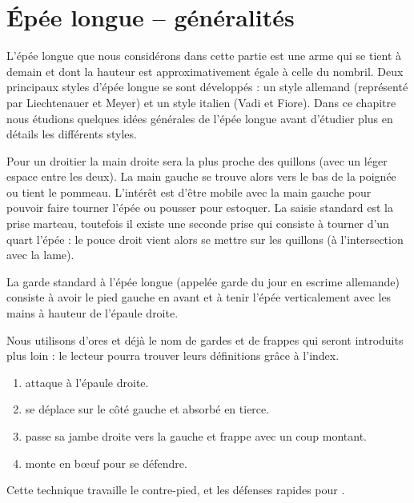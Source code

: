 \chapter{Épée longue -- généralités}


L'épée longue que nous considérons dans cette partie est une arme qui se tient à demain et dont la hauteur est approximativement égale à celle du nombril.
Deux principaux styles d'épée longue se sont développés : un style allemand (représenté par Liechtenauer et Meyer) et un style italien (Vadi et Fiore).
Dans ce chapitre nous étudions quelques idées générales de l'épée longue avant d'étudier plus en détails les différents styles.

Pour un droitier la main droite sera la plus proche des quillons (avec un léger espace entre les deux).
La main gauche se trouve alors vers le bas de la poignée ou tient le pommeau.
L'intérêt est d'être mobile avec la main gauche pour pouvoir faire tourner l'épée ou pousser pour estoquer.
La saisie standard est la prise marteau, toutefois il existe une seconde prise qui consiste à tourner d'un quart l'épée : le pouce droit vient alors se mettre sur les quillons (à l'intersection avec la lame).

La garde standard à l'épée longue (appelée garde du jour en escrime allemande) consiste à avoir le pied gauche en avant et à tenir l'épée verticalement avec les mains à hauteur de l'épaule droite.

Nous utilisons d'ores et déjà le nom de gardes et de frappes qui seront introduits plus loin : le lecteur pourra trouver leurs définitions grâce à l'index.

\begin{technique}

\begin{enumerate}
	\item \A attaque à l'épaule droite.
	
	\item \D se déplace sur le côté gauche et absorbé en tierce.
	
	\item \D passe sa jambe droite vers la gauche et frappe \A avec un coup montant.
	
	\item \A monte en bœuf pour se défendre.
\end{enumerate}

Cette technique travaille le contre-pied, et les défenses rapides pour \A.

\end{technique}


